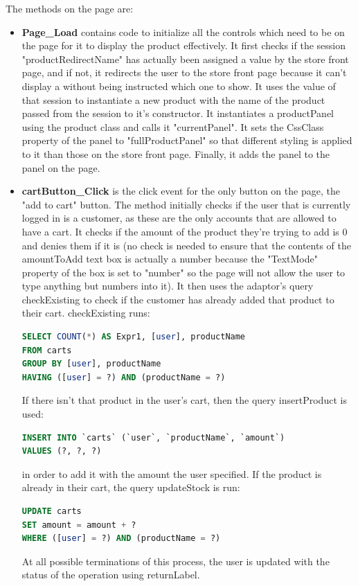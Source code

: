 ﻿\documentclass{article}
\begin{document}
    The methods on the page are:
    \begin{itemize}
        \item \textbf{Page\_Load} contains code to initialize all the controls which need to be on the page for it to display the product effectively.
        It first checks if the session "productRedirectName" has actually been assigned a value by the store front page, and if not, it redirects the user to the store front page because it can't display a without being instructed which one to show.
        It uses the value of that session to instantiate a new product with the name of the product passed from the session to it's constructor.
        It instantiates a productPanel using the product class and calls it "currentPanel".
        It sets the CssClass property of the panel to "fullProductPanel" so that different styling is applied to it than those on the store front page.
        Finally, it adds the panel to the panel on the page.
        \item \textbf{cartButton\_Click} is the click event for the only button on the page, the "add to cart" button.
        The method initially checks if the user that is currently logged in is a customer, as these are the only accounts that are allowed to have a cart.
        It checks if the amount of the product they're trying to add is 0 and denies them if it is (no check is needed to ensure that the contents of the amountToAdd text box is actually a number because the "TextMode" property of the box is set to "number" so the page will not allow the user to type anything but numbers into it).
        It then uses the adaptor's query checkExisting to check if the customer has already added that product to their cart.
        checkExisting runs:
        \begin{lstlisting}[language=SQL]
SELECT COUNT(*) AS Expr1, [user], productName
FROM carts
GROUP BY [user], productName
HAVING ([user] = ?) AND (productName = ?)
        \end{lstlisting}
        If there isn't that product in the user's cart, then the query insertProduct is used:
        \begin{lstlisting}[language=SQL]
INSERT INTO `carts` (`user`, `productName`, `amount`)
VALUES (?, ?, ?)
        \end{lstlisting}
        in order to add it with the amount the user specified.
        If the product is already in their cart, the query updateStock is run:
        \begin{lstlisting}[language=SQL]
UPDATE carts
SET amount = amount + ?
WHERE ([user] = ?) AND (productName = ?)
        \end{lstlisting}
        At all possible terminations of this process, the user is updated with the status of the operation using returnLabel.
    \end{itemize}
\end{document}
